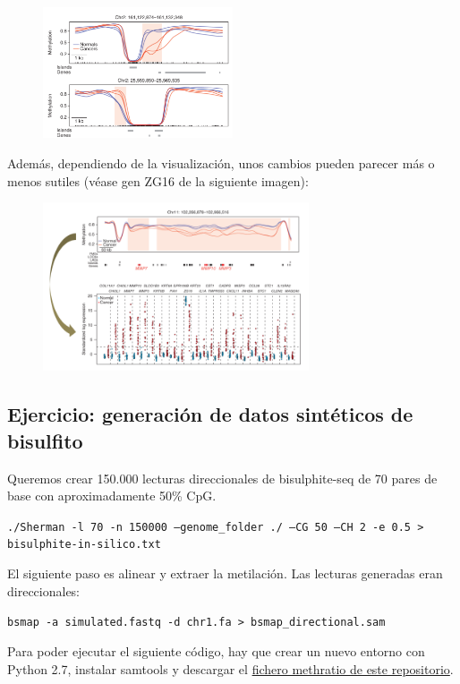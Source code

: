 \begin{figure}[h]
\centering
\includegraphics[width = 0.5\textwidth]{figs/met.png}
\end{figure}

Además, dependiendo de la visualización, unos cambios pueden parecer más o menos sutiles (véase gen ZG16 de la siguiente imagen):

\begin{figure}[h]
\centering
\includegraphics[width = 0.7\textwidth]{figs/met-vis.png}
\end{figure}

\subsection{Ejercicio: generación de datos sintéticos de bisulfito}
Queremos crear 150.000 lecturas direccionales de bisulphite-seq de 70 pares de base con aproximadamente 50\% CpG. 

\texttt{./Sherman -l 70 -n 150000 --genome\_folder ./ --CG 50 --CH 2 -e 0.5 > bisulphite-in-silico.txt}

El siguiente paso es alinear y extraer la metilación. Las lecturas generadas eran direccionales:

\texttt{bsmap -a simulated.fastq -d chr1.fa > bsmap\_directional.sam}

Para poder ejecutar el siguiente código, hay que crear un nuevo entorno con Python 2.7, instalar samtools y descargar el \href{https://github.com/dpryan79/Answers/tree/master/biostars_112049}{fichero methratio de este repositorio}.

